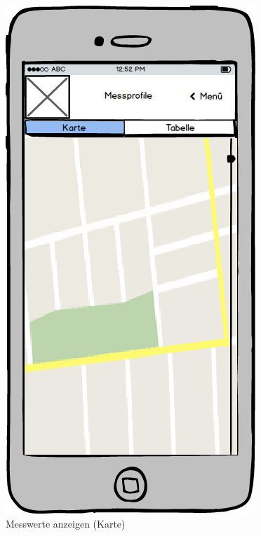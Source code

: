 \begin{figure}
	\centering
	\includegraphics[scale=0.8]{images/MesswerteAnzeigenKarte}
	\caption{Messwerte anzeigen (Karte)}
\end{figure}
\newpage

